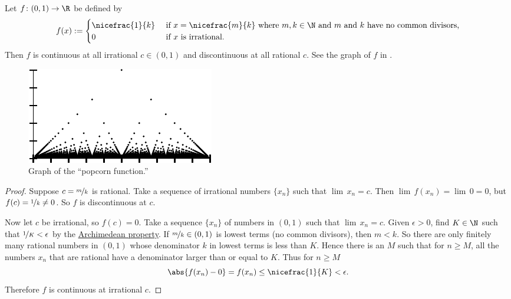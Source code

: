 \documentclass[12pt]{book}
\begin{document}
\begin{example} \label{popcornfunction:example}
Let $f \colon (0,1) \to \R$ be defined by
\begin{equation*}
f(x) := 
\begin{cases}
\nicefrac{1}{k} & \text{ if $x=\nicefrac{m}{k}$ where $m,k \in \N$
and $m$ and $k$ have no common divisors,} \\
0 & \text{ if $x$ is irrational}.
\end{cases}
\end{equation*}
Then $f$ is continuous at all irrational $c \in (0,1)$ and 
discontinuous at all rational $c$.
See the graph of $f$
in .
\begin{figure}[h!t]
\begin{center}
\includegraphics{popcornfig}
\caption{Graph of the ``popcorn function.''\label{popcornfig}}
\end{center}
\end{figure}

\begin{proof}
Suppose $c = \nicefrac{m}{k}$ is rational.
Take a sequence of
irrational numbers $\{ x_n \}$ such that $\lim\, x_n = c$.
Then
$\lim\, f(x_n) = \lim \, 0 = 0$, but $f(c) = \nicefrac{1}{k} \not= 0$.
So $f$
is discontinuous at $c$.

Now let $c$ be irrational, so $f(c) = 0$.
Take a sequence 
$\{ x_n \}$ of numbers in $(0,1)$ such that $\lim\, x_n = c$.
Given $\epsilon > 0$, find $K \in \N$ such
that $\nicefrac{1}{K} < \epsilon$
by the \hyperref[thm:arch:i]{Archimedean property}.
If $\nicefrac{m}{k} \in (0,1)$ is lowest terms
(no common divisors), then $m < k$.
So there are only finitely many rational numbers in $(0,1)$
whose denominator $k$ in lowest terms is less than $K$.
Hence
there is an $M$ such that for $n \geq M$, all the numbers $x_n$
that are rational
have a denominator larger than or equal to $K$.
Thus for $n \geq M$
\begin{equation*}
\abs{f(x_n) - 0} = f(x_n) \leq \nicefrac{1}{K} < \epsilon .
\end{equation*}
Therefore $f$ is continuous at irrational $c$.
\end{proof}
\end{example}
\end{document}
